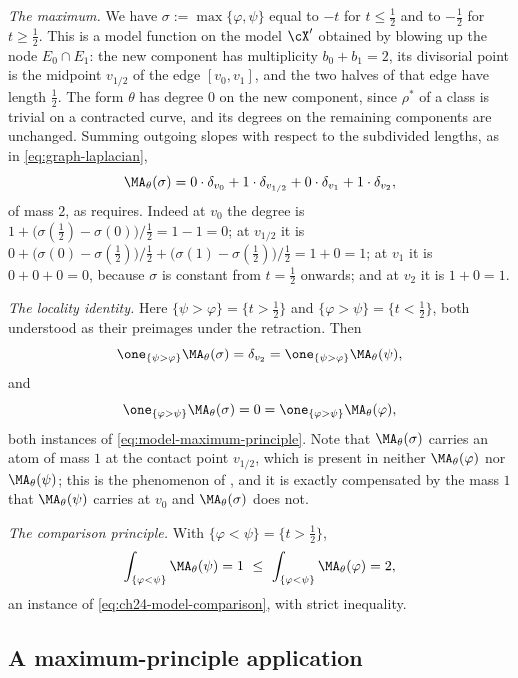 \begin{example}
\emph{The maximum.}  We have
\(\sigma:=\max\{\varphi,\psi\}\) equal to \(-t\) for \(t\leq\tfrac12\) and to
\(-\tfrac12\) for \(t\geq\tfrac12\).  This is a model function on the model
\(\cX'\) obtained by blowing up the node \(E_0\cap E_1\): the new component
has multiplicity \(b_0+b_1=2\), its divisorial point is the midpoint
\(v_{1/2}\) of the edge \([v_0,v_1]\), and the two halves of that edge have
length \(\tfrac12\).  The form \(\theta\) has degree \(0\) on the new
component, since \(\rho^*\) of a class is trivial on a contracted curve, and
its degrees on the remaining components are unchanged.  Summing outgoing
slopes with respect to the subdivided lengths, as in
\eqref{eq:graph-laplacian},
\[
 \MA_\theta(\sigma)
 =0\cdot\delta_{v_0}+1\cdot\delta_{v_{1/2}}
  +0\cdot\delta_{v_1}+1\cdot\delta_{v_2},
\]
of mass \(2\), as  requires.  Indeed at \(v_0\) the
degree is \(1+\bigl(\sigma(\tfrac12)-\sigma(0)\bigr)/\tfrac12=1-1=0\); at
\(v_{1/2}\) it is
\(0+\bigl(\sigma(0)-\sigma(\tfrac12)\bigr)/\tfrac12
 +\bigl(\sigma(1)-\sigma(\tfrac12)\bigr)/\tfrac12=1+0=1\); at \(v_1\) it is
\(0+0+0=0\), because \(\sigma\) is constant from \(t=\tfrac12\) onwards; and
at \(v_2\) it is \(1+0=1\).

\emph{The locality identity.}  Here \(\{\psi>\varphi\}=\{t>\tfrac12\}\) and
\(\{\varphi>\psi\}=\{t<\tfrac12\}\), both understood as their preimages
under the retraction.  Then
\[
 \one_{\{\psi>\varphi\}}\MA_\theta(\sigma)=\delta_{v_2}
 =\one_{\{\psi>\varphi\}}\MA_\theta(\psi),
\]
and
\[
 \one_{\{\varphi>\psi\}}\MA_\theta(\sigma)=0
 =\one_{\{\varphi>\psi\}}\MA_\theta(\varphi),
\]
both instances of \eqref{eq:model-maximum-principle}.  Note that
\(\MA_\theta(\sigma)\) carries an atom of mass \(1\) at the contact point
\(v_{1/2}\), which is present in neither \(\MA_\theta(\varphi)\) nor
\(\MA_\theta(\psi)\); this is the phenomenon of
, and it is exactly compensated by the mass
\(1\) that \(\MA_\theta(\psi)\) carries at \(v_0\) and
\(\MA_\theta(\sigma)\) does not.

\emph{The comparison principle.}  With
\(\{\varphi<\psi\}=\{t>\tfrac12\}\),
\[
 \int_{\{\varphi<\psi\}}\MA_\theta(\psi)=1
 \ \leq\
 \int_{\{\varphi<\psi\}}\MA_\theta(\varphi)=2 ,
\]
an instance of \eqref{eq:ch24-model-comparison}, with strict inequality.
\end{example}

\subsection{A maximum-principle application}
\label{sec:ch24-ex-maxprin}

